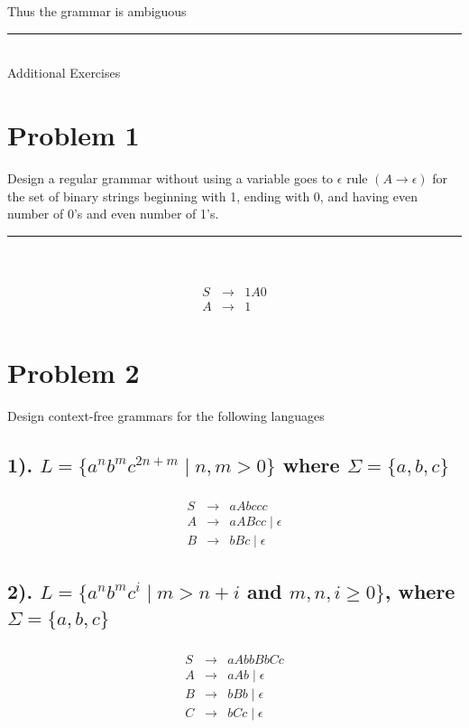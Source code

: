 \documentclass[20pt]{article} %
\begin{document}
Thus the grammar is ambiguous

\noindent\rule{15cm}{0.4pt} \\
Additional Exercises
\section{Problem 1}
Design a regular grammar without using a variable goes to $\epsilon$ rule $(A \rightarrow \epsilon)$ for the set of binary strings beginning with 1, ending with 0, and having even number of 0's and even number of 1's.
 \noindent\rule{2cm}{0.4pt} \\

 \begin{table}[!htbp]
 \[\begin{array}{ccc} 
&  \\
 S & \rightarrow & 1A0 \\
 A & \rightarrow &  1 \\
 \end{array}\]
 \end{table}

\section{Problem 2}
Design context-free grammars for the following languages
\subsection{1). $L = \{ a^{n}b^{m}c^{2n+m} \mid n,m > 0\}$ where $\Sigma = \{a,b,c\}$}
 \begin{table}[!htbp]
 \[\begin{array}{ccc} 
&  \\
 S & \rightarrow & aAbccc \\
 A & \rightarrow & aABcc \mid \epsilon \\
 B & \rightarrow & bBc \mid \epsilon
 \end{array}\]
 \end{table}
\subsection{2). $L = \{a^{n}b^{m}c^{i} \mid m > n + i$ and $m,n,i \geq 0\}$, where $\Sigma = \{a,b,c\}$}
 \begin{table}[!htbp]
 \[\begin{array}{ccc} 
&  \\
 S & \rightarrow & aAbbBbCc \\
 A & \rightarrow & aAb \mid \epsilon \\
 B & \rightarrow & bBb \mid \epsilon \\
 C & \rightarrow & bCc \mid \epsilon 
 \end{array}\]
 \end{table}
\end{document}
